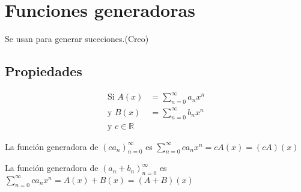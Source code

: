 \documentclass[../main.tex]{subfiles}
\begin{document}
\chapter{Funciones generadoras}%

\thispagestyle{fancy}

Se usan para generar suceciones.(Creo)

\section{Propiedades}%
\label{sec:propiedades}

\begin{align*}
	\text{Si } A(x) &=
	\sum_{n=0}^\infty a_nx^n\\
	\text{y } B(x) &=
	\sum_{n=0}^\infty b_nx^n\\
	\text{y } c \in\mathbb{R}
\end{align*}

La función generadora de $\left(ca_n\right)^\infty_{n=0}$
es $\sum_{n=0}^\infty ca_nx^n=cA(x)=(cA)(x)$

La función generadora de $(a_n+b_n)^\infty_{n=0}$
es $\sum_{n=0}^\infty ca_nx^n=A(x)+B(x)=(A+B)(x)$
\end{document}
